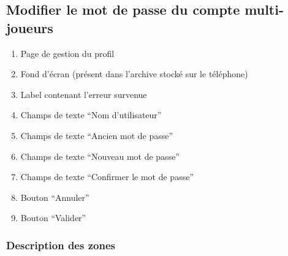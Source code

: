 \documentclass{report}
\begin{document}
\newpage

	\subsection{Modifier le mot de passe du compte multi-joueurs}
		
		\hypertarget{Modifier le mot de passe du compte multi-joueurs}{}
		\label{Modifier le mot de passe du compte multi-joueurs}
			
		\begin{center}
			
		\end{center}
		
		\begin{enumerate}
		  \item Page de gestion du profil
		  \item Fond d'écran (présent dans l'archive stocké sur le téléphone)
		  \item Label contenant l’erreur survenue
		  \item Champs de texte ``Nom d'utilisateur''
		  \item Champs de texte ``Ancien mot de passe''
		  \item Champs de texte ``Nouveau mot de passe''
		  \item Champs de texte ``Confirmer le mot de passe''
		  \item Bouton ``Annuler''
		  \item Bouton ``Valider''
		\end{enumerate}

		\subsubsection{Description des zones}
		
\end{document}
